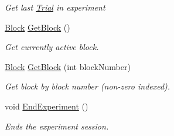 \begin{DoxyCompactItemize}
\begin{DoxyCompactList}\small\item\em Get last \hyperlink{class_exp_mngr_1_1_trial}{Trial} in experiment \end{DoxyCompactList}\item 
\hyperlink{class_exp_mngr_1_1_block}{Block} \hyperlink{class_exp_mngr_1_1_experiment_session_a891451cca778e4f355959cf921af138c}{Get\+Block} ()
\begin{DoxyCompactList}\small\item\em Get currently active block. \end{DoxyCompactList}\item 
\hyperlink{class_exp_mngr_1_1_block}{Block} \hyperlink{class_exp_mngr_1_1_experiment_session_a0b9ded24b08e7b596b5ee4e9984827b5}{Get\+Block} (int block\+Number)
\begin{DoxyCompactList}\small\item\em Get block by block number (non-\/zero indexed). \end{DoxyCompactList}\item 
void \hyperlink{class_exp_mngr_1_1_experiment_session_a831911945b3852b392b6e9456bc91e05}{End\+Experiment} ()
\begin{DoxyCompactList}\small\item\em Ends the experiment session. \end{DoxyCompactList}\end{DoxyCompactItemize}
